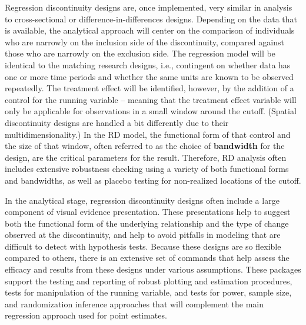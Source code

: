 Regression discontinuity designs are, once implemented,
very similar in analysis to cross-sectional or difference-in-differences designs.
Depending on the data that is available,
the analytical approach will center on the comparison of individuals
who are narrowly on the inclusion side of the discontinuity,
compared against those who are narrowly on the exclusion side.
The regression model will be identical to the matching research designs,
i.e., contingent on whether data has one or more time periods
and whether the same units are known to be observed repeatedly.
The treatment effect will be identified, however, by the addition of a control
for the running variable -- meaning that the treatment effect variable
will only be applicable for observations in a small window around the cutoff.
(Spatial discontinuity designs are handled a bit differently due to their multidimensionality.)
In the RD model, the functional form of that control and the size of that window,
often referred to as the choice of \textbf{bandwidth} for the design,
are the critical parameters for the result.\cite{calonico2019regression}
Therefore, RD analysis often includes extensive robustness checking
using a variety of both functional forms and bandwidths,
as well as placebo testing for non-realized locations of the cutoff.

In the analytical stage, regression discontinuity designs
often include a large component of visual evidence presentation.
These presentations help to suggest both the functional form
of the underlying relationship and the type of change observed at the discontinuity,
and help to avoid pitfalls in modeling that are difficult to detect with hypothesis tests.
Because these designs are so flexible compared to others,
there is an extensive set of commands that help assess
the efficacy and results from these designs under various assumptions.
These packages support the testing and reporting
of robust plotting and estimation procedures,
tests for manipulation of the running variable,
and tests for power, sample size, and randomization inference approaches
that will complement the main regression approach used for point estimates.

